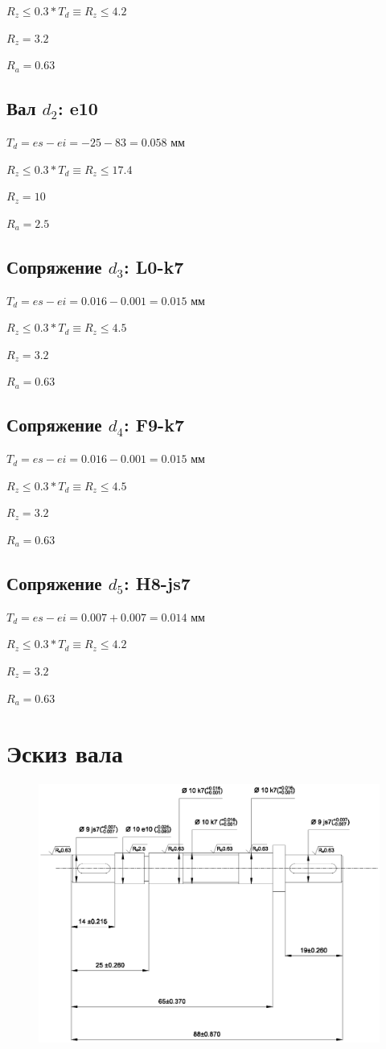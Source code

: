 \documentclass[a4paper,fontsize=12pt]{article}
\begin{document}
$R_z \leq 0.3 * T_d \equiv R_z \leq 4.2$

$R_z = 3.2$

$R_a = 0.63$

\subsection{Вал $d_2$:  e10}
$T_d = es - ei = -25 - 83 = 0.058$ мм

$R_z \leq 0.3 * T_d \equiv R_z \leq 17.4$

$R_z = 10$

$R_a = 2.5$

\subsection{Сопряжение $d_3$:  L0-k7}
$T_d = es - ei = 0.016 - 0.001 = 0.015$ мм

$R_z \leq 0.3 * T_d \equiv R_z \leq 4.5$

$R_z = 3.2$

$R_a = 0.63$


\subsection{Сопряжение $d_4$:  F9-k7}
$T_d = es - ei = 0.016 - 0.001 = 0.015$ мм

$R_z \leq 0.3 * T_d \equiv R_z \leq 4.5$

$R_z = 3.2$

$R_a = 0.63$

\subsection{Сопряжение $d_5$:  H8-js7}
$T_d = es - ei = 0.007 + 0.007 = 0.014$ мм

$R_z \leq 0.3 * T_d \equiv R_z \leq 4.2$

$R_z = 3.2$

$R_a = 0.63$

\newpage
\section{Эскиз вала}

\begin{figure}[h]
    \centering
    \includegraphics[width=16cm]{images/draw2.eps}
    \label{fig:draw2}
\end{figure}
\end{document}
